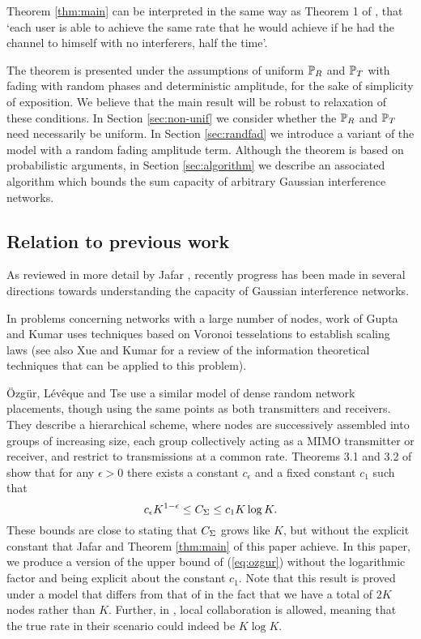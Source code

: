 \documentclass[journal]{IEEEtran}
\begin{document}
Theorem \ref{thm:main} can be interpreted in the same way as Theorem 1 of \cite{jafar},
that `each user is able to achieve the same rate that he would achieve if he
had the channel to himself with no interferers, half the time'. 

The theorem is presented
under the assumptions of uniform ${\mathbb {P}}_R$ and ${\mathbb {P}}_T$ with fading with
random phases and deterministic amplitude,
for the sake of simplicity of exposition. We believe that the main
result will be robust to relaxation of these conditions.
 In Section \ref{sec:non-unif} we consider whether the ${\mathbb {P}}_R$ and ${\mathbb {P}}_T$ need
necessarily be uniform. In Section \ref{sec:randfad} we introduce a variant of the model
with a random fading amplitude term. Although the theorem is based on probabilistic arguments, 
 in Section \ref{sec:algorithm} we describe an associated algorithm which
bounds the sum capacity of arbitrary Gaussian interference networks.
%
\subsection{Relation to previous work}
%
As reviewed in more detail by Jafar \cite{jafar}, recently  
progress has been made in several directions towards understanding 
the capacity of Gaussian interference networks.

In problems concerning networks with a large number of 
nodes, work of Gupta and Kumar \cite{gupta} uses
techniques based on Voronoi tesselations to establish scaling laws
(see also Xue and Kumar \cite{xue} for a review of the information theoretical
techniques that can be applied to this problem). 

{\"O}zg{\"u}r, L{\'e}v{\^e}que and Tse \cite{ozgur2, ozgur}
use a similar model of
dense random network placements, though using the same points as both transmitters
 and receivers.
They describe a hierarchical scheme, where nodes are successively
assembled into groups of increasing size, each group collectively acting as a MIMO
transmitter or receiver, and restrict to transmissions at a common
rate. Theorems 3.1 and 3.2 of \cite{ozgur} show that
for any $\epsilon > 0$ there
exists a constant $c_\epsilon$ and a fixed constant $c_1$ such that 
\begin{equation} \label{eq:ozgur}
c_\epsilon K^{1-\epsilon} \leq C_{\Sigma} \leq c_1 K \log K.
\end{equation}
These bounds are close to stating that $C_{\Sigma}$
grows like $K$,  but without 
the explicit constant
that Jafar \cite{jafar} and Theorem \ref{thm:main} of this paper achieve. 
In this paper, we produce a version of the upper bound of 
(\ref{eq:ozgur}) without the logarithmic factor 
and being explicit about the constant $c_1$. Note that this result is proved under a model 
that differs from that of \cite{ozgur} in the fact that we have a total of $2K$ nodes rather than $K$. Further, in \cite{ozgur}, local collaboration is
allowed, meaning that the true rate in their scenario
could indeed be $K \log K$.
\end{document}
